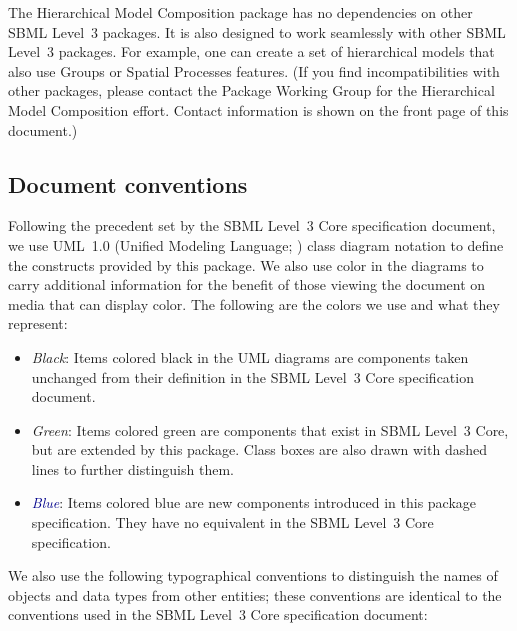 The Hierarchical Model Composition package has no dependencies on other SBML Level~3 packages.  It is also designed to work seamlessly with other SBML Level~3 packages.  For example, one can create a set of hierarchical models that also use Groups or Spatial Processes features. (If you find incompatibilities with other packages, please contact the Package Working Group for the Hierarchical Model Composition effort. Contact information is shown on the front page of this document.)


\subsection{Document conventions}
\label{conventions}

Following the precedent set by the SBML Level~3 Core specification document, we use UML~1.0 (Unified Modeling Language; \citealt{eriksson:1998,oestereich:1999}) class diagram notation to define the constructs provided by this package.  We also use color in the diagrams to carry additional information for the benefit of those viewing the document on media that can display color.  The following are the colors we use and what they represent:

\begin{itemize}

\item[\raisebox{2.75pt}{\colorbox{black}{\rule{0.8pt}{0.8pt}}}] \emph{Black}: Items colored black in the UML diagrams are components taken unchanged from their definition in the SBML Level~3 Core specification document.

\item[\raisebox{2.75pt}{\colorbox{mediumgreen}{\rule{0.8pt}{0.8pt}}}] \emph{\textcolor{mediumgreen}{Green}}: Items colored green are components that exist in SBML Level~3 Core, but are extended by this package.  Class boxes are also drawn with dashed lines to further distinguish them.

\item[\raisebox{2.75pt}{\colorbox{darkblue}{\rule{0.8pt}{0.8pt}}}] \emph{\textcolor{darkblue}{Blue}}: Items colored blue are new components introduced in this package specification.  They have no equivalent in the SBML Level~3 Core specification.

\end{itemize}

We also use the following typographical conventions to distinguish the names of objects and data types from other entities; these conventions are identical to the conventions used in the SBML Level~3 Core specification document:

